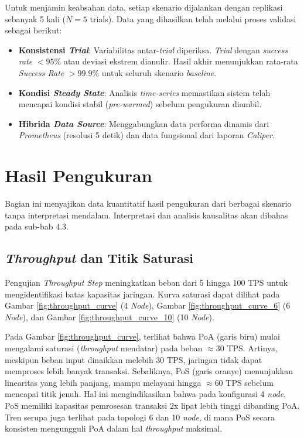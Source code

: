 Untuk menjamin keabsahan data, setiap skenario dijalankan dengan replikasi sebanyak 5 kali ($N=5$ trials). Data yang dihasilkan telah melalui proses validasi sebagai berikut:
\begin{itemize}
    \item \textbf{Konsistensi \textit{Trial}}: Variabilitas antar-\textit{trial} diperiksa. \textit{Trial} dengan \textit{success rate} $< 95\%$ atau deviasi ekstrem dianulir. Hasil akhir menunjukkan rata-rata \textit{Success Rate} $> 99.9\%$ untuk seluruh skenario \textit{baseline}.
    \item \textbf{Kondisi \textit{Steady State}}: Analisis \textit{time-series} memastikan sistem telah mencapai kondisi stabil (\textit{pre-warmed}) sebelum pengukuran diambil.
    \item \textbf{Hibrida \textit{Data Source}}: Menggabungkan data performa dinamis dari \textit{Prometheus} (resolusi 5 detik) dan data fungsional dari laporan \textit{Caliper}.
\end{itemize}

\section{Hasil Pengukuran}

Bagian ini menyajikan data kuantitatif hasil pengukuran dari berbagai skenario tanpa interpretasi mendalam. Interpretasi dan analisis kausalitas akan dibahas pada sub-bab 4.3.

\subsection{\textit{Throughput} dan Titik Saturasi}

Pengujian \textit{Throughput Step} meningkatkan beban dari 5 hingga 100 TPS untuk mengidentifikasi batas kapasitas jaringan. Kurva saturasi dapat dilihat pada Gambar \ref{fig:throughput_curve} (4 \textit{Node}), Gambar \ref{fig:throughput_curve_6} (6 \textit{Node}), dan Gambar \ref{fig:throughput_curve_10} (10 \textit{Node}).

Pada Gambar \ref{fig:throughput_curve}, terlihat bahwa PoA (garis biru) mulai mengalami saturasi (\textit{throughput} mendatar) pada beban $\approx$30 TPS. Artinya, meskipun beban input dinaikkan melebih 30 TPS, jaringan tidak dapat memproses lebih banyak transaksi. Sebaliknya, PoS (garis oranye) menunjukkan linearitas yang lebih panjang, mampu melayani hingga $\approx$60 TPS sebelum mencapai titik jenuh. Hal ini mengindikasikan bahwa pada konfigurasi 4 \textit{node}, PoS memiliki kapasitas pemrosesan transaksi 2x lipat lebih tinggi dibanding PoA. Tren serupa juga terlihat pada topologi 6 dan 10 \textit{node}, di mana PoS secara konsisten mengungguli PoA dalam hal \textit{throughput} maksimal.

